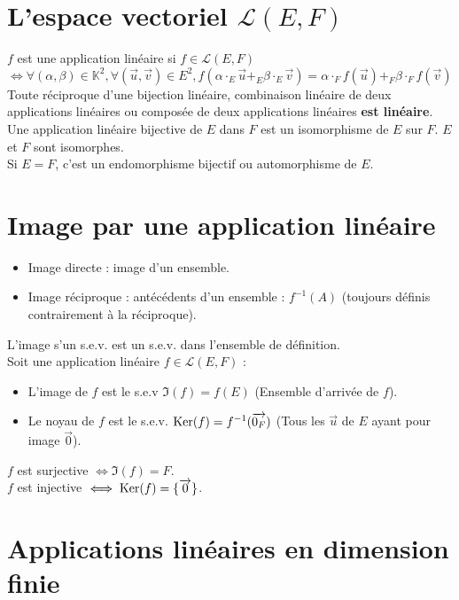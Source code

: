 \section{L'espace vectoriel $\mathcal{L}(E, F)$}\label{sec:l'espace-vectoriel-$mathcal{l}(e-f)$}
  
  $f$ est une application linéaire si $f \in \mathcal{L}(E, F)$\\
  $\iff \forall (\alpha, \beta) \in \mathbb{K}^2, \forall (\vec u, \vec v) \in E^2, f(\alpha \cdot_E \vec u +_E  \beta \cdot_E \vec v) = \alpha \cdot_F f(\vec u) +_F \beta \cdot_F f(\vec v)$\\
  
  Toute réciproque d'une bijection linéaire, combinaison linéaire de deux applications linéaires ou composée de deux applications linéaires \textbf{est linéaire}.\\
  Une application linéaire bijective de $E$ dans $F$ est un isomorphisme de $E$ sur $F$.
  $E$ et $F$ sont isomorphes.\\
  Si $E = F$, c'est un endomorphisme bijectif ou automorphisme de $E$.


\section{Image par une application linéaire}\label{sec:image-par-une-application-lineaire}
  
  \begin{itemize}
    \item Image directe : image d'un ensemble.
    \item Image réciproque : antécédents d'un ensemble : $f^{-1}(A)$ (toujours définis contrairement à la réciproque).
  \end{itemize}
  
  L'image s'un s.e.v. est un s.e.v. dans l'ensemble de définition.\\
  
  Soit une application linéaire $f \in \mathcal{L}(E, F)$ :
  \begin{itemize}
    \item L'image de $f$ est le s.e.v $\Im(f) = f(E)$ (Ensemble d'arrivée de $f$).
    \item Le noyau de $f$ est le s.e.v. $\operatorname{Ker}(f) = f^{-1}(\overrightarrow{0_F})$ (Tous les $\vec u$ de $E$ ayant pour image $\vec 0$).
  \end{itemize}
  
  $f$ est surjective $\iff \Im(f) = F$.\\
  $f$ est injective $\iff \operatorname{Ker}(f) = \{\overrightarrow 0\}$.


\section{Applications linéaires en dimension finie}\label{sec:applications-lineaires-en-dimension-finie}
